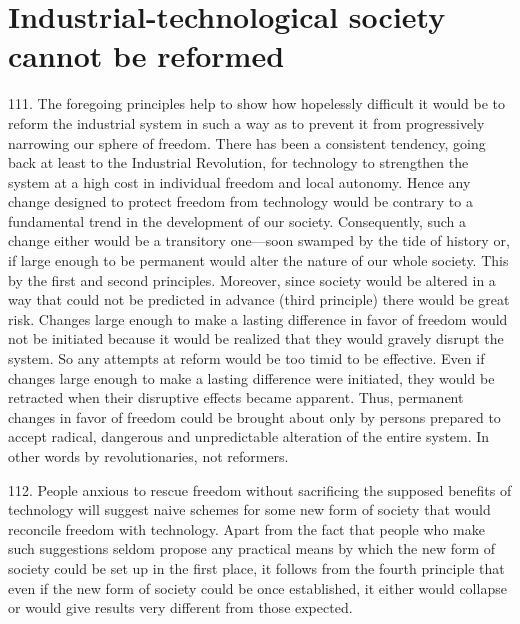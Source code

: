 \documentclass{article}
\begin{document}
\section{Industrial-technological society cannot be reformed}

\hspace{0.5cm} 111.  The  foregoing  principles  help  to  show  how  hopelessly  difficult  it  would  be  to  reform  the  
industrial  system  in  such  a  way  as  to  prevent  it  from  progressively  narrowing  our  sphere  of  
freedom.  There has been a consistent tendency, going back at least to the Industrial Revolution, 
for technology to strengthen the system at a high cost in individual freedom and local 
autonomy.  Hence any change designed to protect freedom from technology would be contrary to 
a fundamental trend in the development of our society.  Consequently, such a change either would 
be a transitory one—soon swamped by the tide of history or, if large enough to be permanent 
would alter the nature of our whole society.  This by the first and second principles.  Moreover, 
since  society  would  be  altered  in  a  way  that  could  not  be  predicted  in  advance  (third  principle)  
there would be great risk.  Changes large enough to make a lasting difference in favor of freedom 
would not be initiated because it would be realized that they would gravely disrupt the system.  So 
any attempts at reform would be too timid to be effective.  Even if changes large enough to make 
a lasting difference were initiated, they would be retracted when their disruptive effects became 
apparent.  Thus, permanent changes in favor of freedom could be brought about only by persons 
prepared to accept radical, dangerous and unpredictable alteration of the entire system.  In other 
words by revolutionaries, not reformers. \vspace{\baselineskip}

112.  People  anxious to  rescue  freedom  without  sacrificing  the  supposed  benefits  of  technology  
will  suggest  naive  schemes  for  some  new  form  of  society  that  would  reconcile  freedom  with  
technology.   Apart  from  the  fact  that  people  who  make  such  suggestions  seldom  propose  any  
practical means by which the new form of society could be set up in the first place, it follows from 
the fourth principle that even if the new form of society could be once established, it either would 
collapse or would give results very different from those expected. \vspace{\baselineskip}
\end{document}
